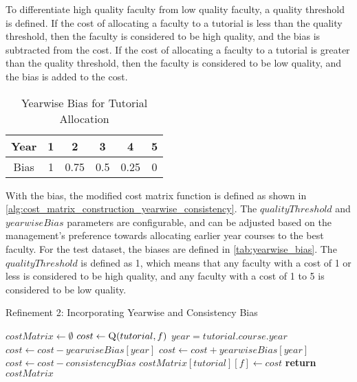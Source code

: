 To differentiate high quality faculty from low quality faculty, a quality threshold is defined. If the cost of allocating a faculty to a tutorial is less than the quality threshold, then the faculty is considered to be high quality, and the bias is subtracted from the cost. If the cost of allocating a faculty to a tutorial is greater than the quality threshold, then the faculty is considered to be low quality, and the bias is added to the cost.

\begin{table}[H]
  \centering
  \begin{tabular}{|c|c|c|c|c|c|}
    \hline
    Year & 1 & 2    & 3   & 4    & 5 \\ \hline
    Bias & 1 & 0.75 & 0.5 & 0.25 & 0 \\ \hline
  \end{tabular}
  \caption{Yearwise Bias for Tutorial Allocation}
  \label{tab:yearwise_bias}
\end{table}

With the bias, the modified cost matrix function is defined as shown in \autoref{alg:cost_matrix_construction_yearwise_consistency}. The $qualityThreshold$ and $yearwiseBias$ parameters are configurable, and can be adjusted based on the management's preference towards allocating earlier year courses to the best faculty. For the test dataset, the biases are defined in \autoref{tab:yearwise_bias}. The $qualityThreshold$ is defined as 1, which means that any faculty with a cost of 1 or less is considered to be high quality, and any faculty with a cost of 1 to 5 is considered to be low quality.


\begin{algorithm}[H]
  \caption*{Refinement 2: Incorporating Yearwise and Consistency Bias}
  \begin{algorithmic}
    \State $costMatrix \gets \emptyset$
    \State $cost \gets \Call{Q}{tutorial, f}$
    \State $year = tutorial.course.year$
    \State $cost \gets cost - yearwiseBias[year]$
    \Else
    \State $cost \gets cost + yearwiseBias[year]$
    \EndIf
    \State $cost \gets cost - consistencyBias$
    \State $costMatrix[tutorial][f] \gets cost$
    \EndIf
    \EndFor
    \EndFor
    \State \textbf{return} $costMatrix$
    \EndProcedure
  \end{algorithmic}
\end{algorithm}

